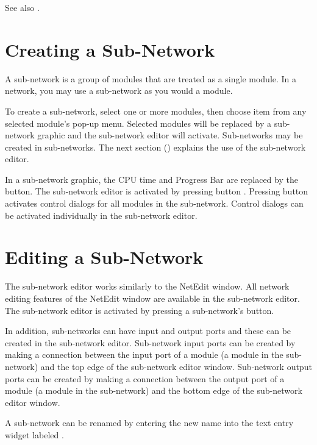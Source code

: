 See also .

\section{Creating a Sub-Network}
\label{sec:crsubnet}

A sub-network is a group of modules that are treated as a single
module.  In a network, you may use a sub-network as you would a
module.

To create a sub-network, select one or more modules, then choose item
 from any selected module's pop-up menu.
Selected modules will be replaced by a sub-network graphic and the
sub-network editor will activate.  Sub-networks may be created in
sub-networks.  The next section () explains the use of the sub-network
editor.

In a sub-network graphic, the CPU time and Progress Bar are
replaced by the  button.  The sub-network
editor is activated by pressing button .
Pressing button  activates control dialogs for all
modules in the sub-network.  Control dialogs can be activated
individually in the sub-network editor.


\section{Editing a Sub-Network}
\label{sec:editsubnet}

The sub-network editor works similarly to the NetEdit window.  All
network editing features of the NetEdit window are available in the
sub-network editor.  The sub-network editor is activated by pressing a
sub-network's  button.

In addition, sub-networks can have input and output ports and these
can be created in the sub-network editor.  Sub-network input ports can
be created by making a connection between the input port of a module
(a module in the sub-network) and the top edge of the sub-network
editor window.  Sub-network output ports can be created by making a
connection between the output port of a module (a module in the
sub-network) and the bottom edge of the sub-network editor window.

A sub-network can be renamed by entering the new name into the text
entry widget labeled .


